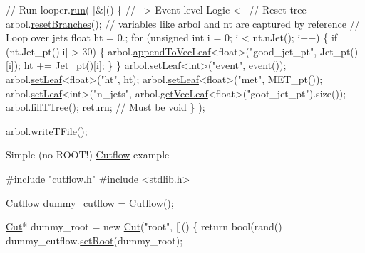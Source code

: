 \begin{DoxyEnumerate}
\begin{DoxyCode}
\textcolor{comment}{// Run}
looper.\hyperlink{classLooper_abfa564ca48778da1f58c8a6444ddd463}{run}(
    [&]()
    \{
        \textcolor{comment}{// --> Event-level Logic <--}
        \textcolor{comment}{// Reset tree}
        arbol.\hyperlink{classArbol_a4c2184d378ab21a9627a57098291a7c4}{resetBranches}(); \textcolor{comment}{// variables like arbol and nt are captured by reference}
        \textcolor{comment}{// Loop over jets}
        \textcolor{keywordtype}{float} ht = 0.;
        \textcolor{keywordflow}{for} (\textcolor{keywordtype}{unsigned} \textcolor{keywordtype}{int} i = 0; i < nt.nJet(); i++) 
        \{
            \textcolor{keywordflow}{if} (nt.Jet\_pt()[i] > 30)
            \{
                arbol.\hyperlink{classArbol_a811156c9134ca7e0015bbe2ab95434b0}{appendToVecLeaf}<\textcolor{keywordtype}{float}>(\textcolor{stringliteral}{"good\_jet\_pt"}, Jet\_pt()[i]);
                ht += Jet\_pt()[i];
            \}
        \}
        arbol.\hyperlink{classArbol_a7a8d3bec0bf5c00635a0b00fcd63cf01}{setLeaf}<\textcolor{keywordtype}{int}>(\textcolor{stringliteral}{"event"}, event());
        arbol.\hyperlink{classArbol_a7a8d3bec0bf5c00635a0b00fcd63cf01}{setLeaf}<\textcolor{keywordtype}{float}>(\textcolor{stringliteral}{"ht"}, ht);
        arbol.\hyperlink{classArbol_a7a8d3bec0bf5c00635a0b00fcd63cf01}{setLeaf}<\textcolor{keywordtype}{float}>(\textcolor{stringliteral}{"met"}, MET\_pt());
        arbol.\hyperlink{classArbol_a7a8d3bec0bf5c00635a0b00fcd63cf01}{setLeaf}<\textcolor{keywordtype}{int}>(\textcolor{stringliteral}{"n\_jets"}, arbol.\hyperlink{classArbol_a634be85d92f5f26403407952b10a29fd}{getVecLeaf}<\textcolor{keywordtype}{float}>(\textcolor{stringliteral}{"goot\_jet\_pt"}).size());
        arbol.\hyperlink{classArbol_a1d029dd97a0451281c774b578d93bcda}{fillTTree}();
        \textcolor{keywordflow}{return}; \textcolor{comment}{// Must be void}
    \}
);

arbol.\hyperlink{classArbol_ade7d835bbe383a70006e86785ae5672c}{writeTFile}();
\end{DoxyCode}

\item Simple (no R\+O\+O\+T!) \hyperlink{classCutflow}{Cutflow} example 
\begin{DoxyCode}
\textcolor{preprocessor}{#include "cutflow.h"}
\textcolor{preprocessor}{#include <stdlib.h>}

\hyperlink{classCutflow}{Cutflow} dummy\_cutflow = \hyperlink{classCutflow}{Cutflow}();

\hyperlink{classCut}{Cut}* dummy\_root = \textcolor{keyword}{new} \hyperlink{classCut}{Cut}(\textcolor{stringliteral}{"root"}, []() \{ \textcolor{keywordflow}{return} bool(rand() %
dummy\_cutflow.\hyperlink{classCutflow_ad27d37141c3748779a5d81fad919ecbb}{setRoot}(dummy\_root);


\end{DoxyCode}
\end{DoxyEnumerate}
